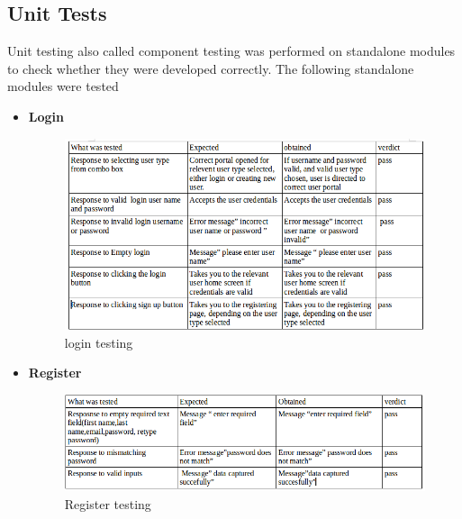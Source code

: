 \documentclass[11 pt]{article}
\begin{document}
\subsection{Unit Tests}
Unit testing also called component testing was performed on standalone modules to check whether they were developed correctly. The following standalone modules were tested
\begin{itemize}
\item \textbf{Login}
\begin{figure}[h]
    \centering
    
    \includegraphics[width=\linewidth]{Logins.png}
    \caption{login testing}
    \label{fig:ERD}
    \end{figure}
\newpage
\item \textbf{Register}
\begin{figure}[h]
    \centering
    
    \includegraphics[width=\linewidth]{register.png}
    \caption{Register testing}
    \label{fig:ERD}
    \end{figure}

\end{itemize}


 
\end{document}
